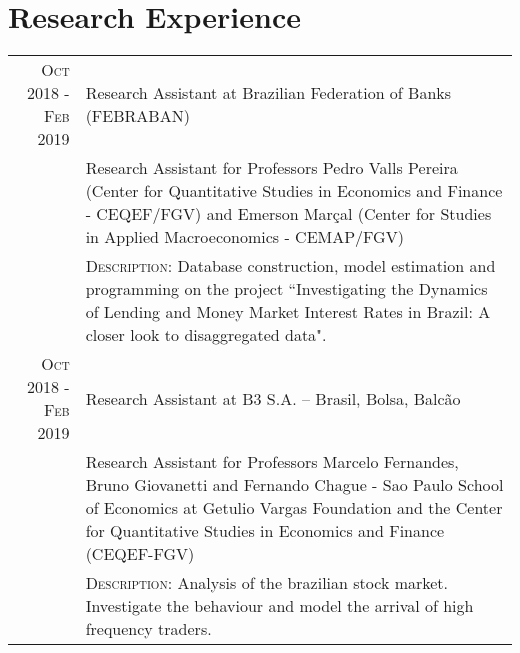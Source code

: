\documentclass[a4paper,10pt]{article}
\begin{document}

\section{Research Experience}
\begin{tabular}{r|p{10.75cm}}
    \textsc{Oct 2018 - Feb 2019} & Research Assistant at Brazilian Federation of Banks (FEBRABAN) \\
    &\footnotesize{Research Assistant for Professors Pedro Valls Pereira (Center for Quantitative Studies in Economics and Finance - CEQEF/FGV) and Emerson Marçal (Center for Studies in Applied Macroeconomics - CEMAP/FGV)}\\
    &\footnotesize{\textsc{Description}: Database construction, model estimation and programming on the project ``Investigating the Dynamics of Lending and Money Market Interest Rates in Brazil: A closer look to disaggregated data".} \\
    \textsc{Oct 2018 - Feb 2019} & Research Assistant at B3 S.A. – Brasil, Bolsa, Balcão \\
    &\footnotesize{Research Assistant for Professors Marcelo Fernandes, Bruno Giovanetti and Fernando Chague - Sao Paulo School of Economics at Getulio Vargas Foundation and the Center for Quantitative Studies in Economics and Finance (CEQEF-FGV)} \\
    &\footnotesize{\textsc{Description}: Analysis of the brazilian stock market. Investigate the behaviour and model the arrival of high frequency traders.} 
\end{tabular}

\end{document}
